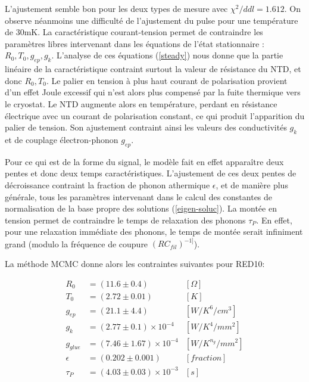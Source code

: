 L'ajustement semble bon pour les deux types de mesure avec $\chi^2/ddl=1.612$. On observe néanmoins une difficulté de l'ajustement du pulse pour une température de $30$mK. La caractéristique courant-tension permet de contraindre les paramètres libres intervenant dans les équations de l'état stationnaire : $R_0, T_0, g_{ep}, g_k$. L'analyse de ces équations (\ref{steady}) nous donne que la partie linéaire de la caractéristique contraint surtout la valeur de résistance du NTD, et donc $R_0, T_0$. Le palier en tension à plus haut courant de polarisation provient d'un effet Joule excessif qui n'est alors plus compensé par la fuite thermique vers le cryostat. Le NTD augmente alors en température, perdant en résistance électrique avec un courant de polarisation constant, ce qui produit l'apparition du palier de tension. Son ajustement contraint ainsi les valeurs des conductivités $g_k$ et de couplage électron-phonon $g_{ep}$.

Pour ce qui est de la forme du signal, le modèle fait en effet apparaître deux pentes et donc deux temps caractéristiques. L'ajustement de ces deux pentes de décroissance contraint la fraction de phonon athermique $\epsilon$, et de manière plus générale, tous les paramètres intervenant dans le calcul des constantes de normalisation de la base propre des solutions (\ref{eigen-soluc}).
La montée en tension permet de contraindre le temps de relaxation des phonons $\tau_P$. En effet, pour une relaxation immédiate des phonons, le temps de montée serait infiniment grand (modulo la fréquence de coupure $(RC_{fil})^{-1]}$).

La méthode MCMC donne alors les contraintes suivantes pour RED10:

\begin{align}
R_0 &= (11.6 \pm 0.4)&[\Omega] \\
T_0 &= (2.72 \pm 0.01) &[K] \\
g_{ep} &= (21.1 \pm 4.4) &[W/K^6/cm^3] \\
g_k &= (2.77 \pm 0.1) \times 10^{-4}&[W/K^4/mm^2] \\
g_{glue} &= (7.46 \pm 1.67) \times 10^{-4} &[W/K^{n_g}/mm^2] \\
\epsilon &= (0.202 \pm 0.001)  & [fraction]\\
\tau_P &= (4.03 \pm 0.03) \times 10^{-3} &[s]
\end{align}

